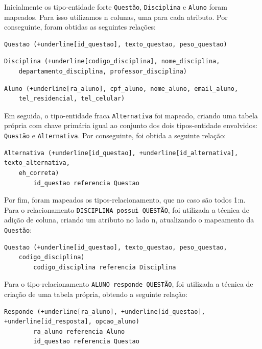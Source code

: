 \documentclass[12pt,a4paper]{article}
\begin{document}
Inicialmente os tipo-entidade forte \texttt{Questão}, \texttt{Disciplina} e \texttt{Aluno} foram mapeados. Para isso utilizamos n colunas, uma para cada atributo. Por conseguinte, foram obtidas as seguintes relações:

\begin{Verbatim}[commandchars=+\[\]]
    Questao (+underline[id_questao], texto_questao, peso_questao)
\end{Verbatim}
\begin{Verbatim}[commandchars=+\[\]]
    Disciplina (+underline[codigo_disciplina], nome_disciplina,
    departamento_disciplina, professor_disciplina)
\end{Verbatim}
\begin{Verbatim}[commandchars=+\[\]]
    Aluno (+underline[ra_aluno], cpf_aluno, nome_aluno, email_aluno,
    tel_residencial, tel_celular)
\end{Verbatim}

Em seguida, o tipo-entidade fraca \texttt{Alternativa} foi mapeado, criando uma tabela própria com chave primária igual ao conjunto dos dois tipos-entidade envolvidos: \texttt{Questão} e \texttt{Alternativa}. Por conseguinte, foi obtida a seguinte relação:

\begin{Verbatim}[commandchars=+\[\]]
    Alternativa (+underline[id_questao], +underline[id_alternativa], texto_alternativa, 
    eh_correta)
        id_questao referencia Questao
\end{Verbatim}

Por fim, foram mapeados os tipos-relacionamento, que no caso são todos 1:n.\\
Para o relacionamento \texttt{DISCIPLINA possui QUESTÃO}, foi utilizada a técnica de adição de coluna, criando um atributo no lado n, atualizando o mapeamento da \texttt{Questão}:

\begin{Verbatim}[commandchars=+\[\]]
    Questao (+underline[id_questao], texto_questao, peso_questao,
    codigo_disciplina)
        codigo_disciplina referencia Disciplina
\end{Verbatim}

Para o tipo-relacionamento \texttt{ALUNO responde QUESTÃO}, foi utilizada a técnica de criação de uma tabela própria, obtendo a seguinte relação:

\begin{Verbatim}[commandchars=+\[\]]
    Responde (+underline[ra_aluno], +underline[id_questao], +underline[id_resposta], opcao_aluno)
        ra_aluno referencia Aluno
        id_questao referencia Questao
\end{Verbatim}
\end{document}
